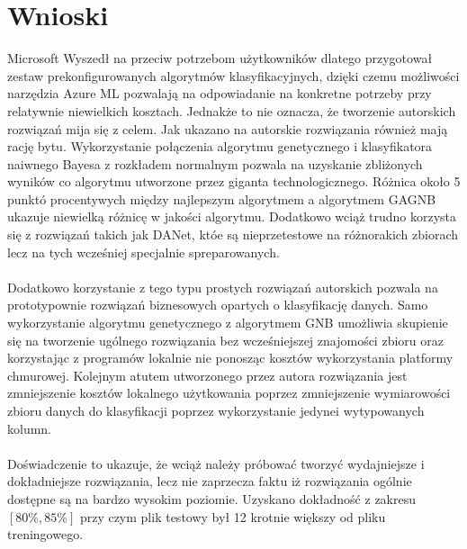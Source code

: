 \section{Wnioski}

Microsoft Wyszedł na przeciw potrzebom użytkowników dlatego przygotował zestaw prekonfigurowanych algorytmów klasyfikacyjnych, dzięki czemu możliwości narzędzia Azure ML pozwalają na odpowiadanie na konkretne potrzeby przy relatywnie niewielkich kosztach. Jednakże to nie oznacza, że tworzenie autorskich rozwiązań mija się z celem. Jak ukazano na  autorskie rozwiązania również mają rację bytu. Wykorzystanie połączenia algorytmu genetycznego i klasyfikatora naiwnego Bayesa z rozkładem normalnym pozwala na uzyskanie zbliżonych wyników co algorytmu utworzone przez giganta technologicznego. Różnica około 5 punktó procentywych między najlepszym algorytmem a algorytmem GAGNB ukazuje niewielką różnicę w jakości algorytmu. Dodatkowo wciąż trudno korzysta się z rozwiązań takich jak DANet, któe są nieprzetestowe na różnorakich zbiorach lecz na tych wcześniej specjalnie spreparowanych.
\\ \\
Dodatkowo korzystanie z tego typu prostych rozwiązań autorskich pozwala na prototypownie rozwiązań biznesowych opartych o klasyfikację danych. Samo wykorzystanie algorytmu genetycznego z algorytmem GNB umożliwia skupienie się na tworzenie ugólnego rozwiązania bez wcześniejszej znajomości zbioru oraz korzystając z programów lokalnie nie ponosząc kosztów wykorzystania platformy chmurowej. Kolejnym atutem utworzonego przez autora rozwiązania jest zmniejszenie kosztów lokalnego użytkowania poprzez zmniejszenie wymiarowości zbioru danych do klasyfikacji poprzez wykorzystanie jedynei wytypowanych kolumn.
\\ \\
Doświadczenie to ukazuje, że wciąż należy próbować tworzyć wydajniejsze i dokładniejsze rozwiązania, lecz nie zaprzecza faktu iż rozwiązania ogólnie dostępne są na bardzo wysokim poziomie. Uzyskano dokładność z zakresu $[80\%, 85\%]$ przy czym plik testowy był 12 krotnie większy od pliku treningowego.


